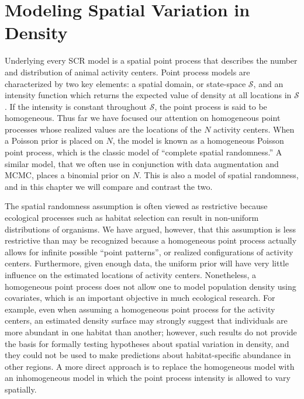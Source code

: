 \chapter{
Modeling Spatial Variation in Density
}
\label{chapt.state-space}

\vspace{0.3cm}

Underlying every SCR model is a spatial point process
that describes the number and distribution of animal activity
centers. Point process models are characterized by two key
elements: a spatial domain, or state-space $\mathcal{S}$, and an
intensity function which returns the
expected value of density at all locations in $\mathcal{S}$.
If the intensity is constant throughout $\mathcal{S}$,
the point process is said to be homogeneous.
Thus far we have focused our attention on homogeneous %
point processes whose realized values are the locations of the $N$
activity centers. When a Poisson prior is
placed on $N$, the model is known as a homogeneous Poisson point process, which
is the classic model of ``complete spatial randomness.''
A similar model, that we often use in conjunction with data
augmentation and MCMC, places a binomial prior on $N$. This is also a
model of spatial randomness, and in this chapter we will compare and
contrast the two.

The spatial randomness assumption is often viewed as restrictive
because ecological processes such as
habitat selection can result in non-uniform
distributions of organisms. We have argued, however, that this
assumption is less restrictive than may be recognized because a
homogeneous point process actually allows for infinite
possible ``point patterns'', or realized configurations of activity
centers. Furthermore, given enough data,
the uniform prior will have very little influence on the estimated
locations of activity centers. Nonetheless, a homogeneous point
process does not allow one to model population density using
covariates, which is an important objective in much ecological research.
For example, even when assuming a homogeneous point process for
the activity centers, an estimated density surface may strongly
suggest that individuals are more abundant in one habitat than
another; however, such results do not provide the basis for formally testing
hypotheses about spatial variation in density, and they could not be
used to make predictions about habitat-specific abundance in other
regions. A more direct approach is to replace the homogeneous model
with an inhomogeneous model in which the point process intensity
is allowed to vary spatially.

